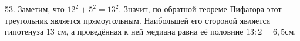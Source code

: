 53. Заметим, что $12^2+5^2=13^2.$ Значит, по обратной теореме Пифагора этот треугольник является прямоугольным. Наибольшей его стороной является гипотенуза 13 см, а проведённая к ней медиана равна её половине $13:2=6,5$см.\\
